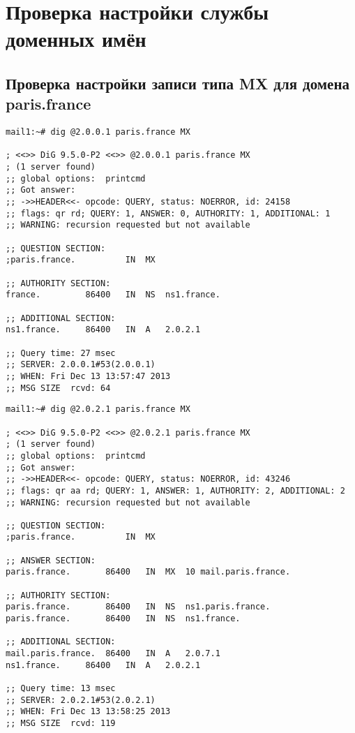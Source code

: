 \documentclass[a4paper,12pt]{article}
\begin{document}
\section{Проверка настройки службы доменных имён}

\subsection{Проверка настройки записи типа MX для домена paris.france}

\begin{verbatim}
mail1:~# dig @2.0.0.1 paris.france MX

; <<>> DiG 9.5.0-P2 <<>> @2.0.0.1 paris.france MX
; (1 server found)
;; global options:  printcmd
;; Got answer:
;; ->>HEADER<<- opcode: QUERY, status: NOERROR, id: 24158
;; flags: qr rd; QUERY: 1, ANSWER: 0, AUTHORITY: 1, ADDITIONAL: 1
;; WARNING: recursion requested but not available

;; QUESTION SECTION:
;paris.france.			IN	MX

;; AUTHORITY SECTION:
france.			86400	IN	NS	ns1.france.

;; ADDITIONAL SECTION:
ns1.france.		86400	IN	A	2.0.2.1

;; Query time: 27 msec
;; SERVER: 2.0.0.1#53(2.0.0.1)
;; WHEN: Fri Dec 13 13:57:47 2013
;; MSG SIZE  rcvd: 64
\end{verbatim}

\begin{verbatim}
mail1:~# dig @2.0.2.1 paris.france MX

; <<>> DiG 9.5.0-P2 <<>> @2.0.2.1 paris.france MX
; (1 server found)
;; global options:  printcmd
;; Got answer:
;; ->>HEADER<<- opcode: QUERY, status: NOERROR, id: 43246
;; flags: qr aa rd; QUERY: 1, ANSWER: 1, AUTHORITY: 2, ADDITIONAL: 2
;; WARNING: recursion requested but not available

;; QUESTION SECTION:
;paris.france.			IN	MX

;; ANSWER SECTION:
paris.france.		86400	IN	MX	10 mail.paris.france.

;; AUTHORITY SECTION:
paris.france.		86400	IN	NS	ns1.paris.france.
paris.france.		86400	IN	NS	ns1.france.

;; ADDITIONAL SECTION:
mail.paris.france.	86400	IN	A	2.0.7.1
ns1.france.		86400	IN	A	2.0.2.1

;; Query time: 13 msec
;; SERVER: 2.0.2.1#53(2.0.2.1)
;; WHEN: Fri Dec 13 13:58:25 2013
;; MSG SIZE  rcvd: 119
\end{verbatim}
\end{document}

